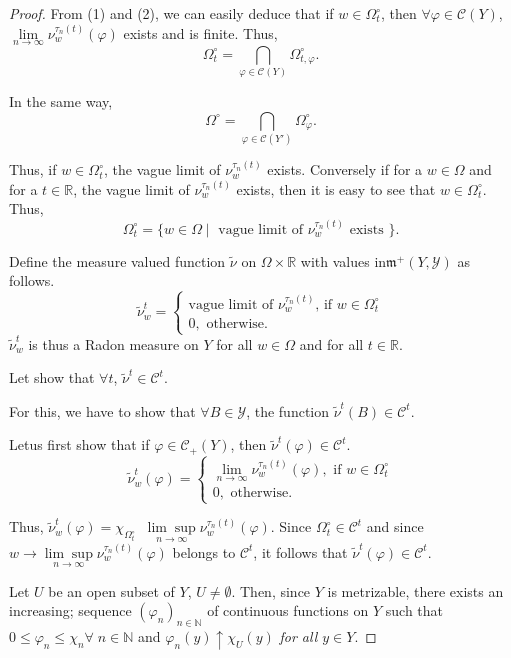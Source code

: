 \begin{proof}
From (1) and (2), we can easily deduce that if $w \in \Omega^\circ_t$,
then $\forall \varphi \in \mathscr{C}(Y)$, $\lim\limits_{n \to \infty}
\nu^{\tau_n(t)}_w(\varphi)$ exists and is finite. Thus, 
$$
\Omega^\circ_t = \bigcap\limits_{\varphi \in \mathscr{C} (Y)}
\Omega^\circ_{t , \varphi}. 
$$

In the same way,
$$
\Omega^\circ = \bigcap\limits_{\varphi \in \mathscr{C}(Y')}
\Omega^\circ_{\varphi}. 
$$

Thus, if $w \in \Omega^\circ_t$, the vague limit of
$\nu^{\tau_n(t)}_w$ exists. Conversely if for a $w \in \Omega$ and for
a $t \in \mathbb{R}$, the vague limit of $\nu^{\tau_n(t)}_w$ exists,
then it is easy to see that $w \in \Omega^\circ_t$. Thus,
$$
\Omega^\circ_t = \{w \in \Omega \mid \text{ vague limit of }
\nu^{\tau_n(t)}_w \text{ exists }\}. 
$$

Define the measure valued function $\tilde{\nu}$ on $\Omega \times
\mathbb{R}$ with values in\break $\mathfrak{m}^+(Y, \mathscr{Y})$ as
follows.
$$
\tilde{\nu}^t_w = 
\begin{cases}
\text{vague limit of $\nu^{\tau_n(t)}_w$, if } w \in \Omega^\circ_t\\
0, \text{ otherwise.}
\end{cases}
$$
$\tilde{\nu}^t_w$ is thus a Radon measure on $Y$ for all $w \in \Omega$
and for all $t \in \mathbb{R}$. 


\medskip
{} Let show that $\forall t$, $\tilde{\nu}^t
\in \mathscr{C}^t$.

For this, we have to show that $\forall B \in \mathscr{Y}$, the
function $\tilde{\nu}^t (B) \in \mathscr{C}^t$. 

Let\pageoriginale us first show that if $\varphi \in \mathscr{C}_+
(Y)$, then $\tilde{\nu}^t (\varphi) \in \mathscr{C}^t$.
$$
\tilde{\nu}^t_w (\varphi) = 
\begin{cases}
\lim\limits_{n\to \infty} \nu^{\tau_n(t)}_w(\varphi), \text{ if } w
\in \Omega^\circ_t\\
0, \text{ otherwise}. 
\end{cases}
$$

Thus, $\tilde{\nu}^t_w(\varphi) = \chi_{\Omega^\circ_t} \;\;  \underset{n
  \to \infty}{\lim\sup} \nu^{\tau_n(t)}_w(\varphi)$. Since
$\Omega^\circ_t \in \mathscr{C}^t$ and since $w \to \underset{n \to
  \infty}{\lim\sup} \nu^{\tau_n(t)}_w(\varphi)$ belongs to
$\mathscr{C}^t$, it follows that $\tilde{\nu}^t(\varphi) \in
\mathscr{C}^t$. 

Let $U$ be an open subset of $Y$, $U \neq \emptyset$. Then, since
$Y$ is metrizable, there exists an increasing; sequence
$(\varphi_n)_{n\in\mathbb{N}}$ of continuous functions on $Y$ such
that $0 \leq \varphi_n \leq \chi_n \forall \; n \in \mathbb{N}$ and
$\varphi_n (y) \uparrow \chi_U(y)$ {\em for all $y \in Y$}. 


\end{proof}
